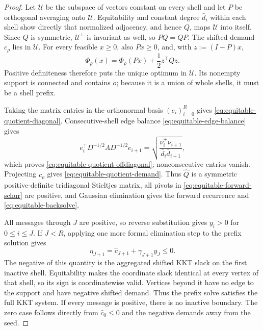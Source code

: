 \begin{proof}
Let $\mathcal U$ be the subspace of vectors constant on every shell and let
$P$ be orthogonal averaging onto $\mathcal U$.  Equitability and constant
degree $\bar d_i$ within each shell show directly that normalized adjacency,
and hence $Q$, maps $\mathcal U$ into itself.  Since $Q$ is symmetric,
$\mathcal U^\perp$ is invariant as well, so $PQ=QP$.  The shifted demand
$c_\rho$ lies in $\mathcal U$.  For every feasible $x\geq0$, also $Px\geq0$,
and, with $z:=(I-P)x$,
\begin{equation}
 \Phi_\rho(x)=\Phi_\rho(Px)+\frac12z^\top Qz.
 \label{eq:equitable-orthogonal-splitting}
\end{equation}
Positive definiteness therefore puts the unique optimum in $\mathcal U$.
Its nonempty support is connected and contains $o$; because it is a union of
whole shells, it must be a shell prefix.

Taking the matrix entries in the orthonormal basis $(e_i)_{i=0}^R$ gives
\cref{eq:equitable-quotient-diagonal}.  Consecutive-shell edge balance
\cref{eq:equitable-edge-balance} gives
\begin{equation*}
 e_i^\top D^{-1/2}AD^{-1/2}e_{i+1}
 =\sqrt{\frac{\nu_i^+\nu_{i+1}^-}
 {\bar d_i\bar d_{i+1}}},
\end{equation*}
which proves
\cref{eq:equitable-quotient-offdiagonal}; nonconsecutive entries vanish.
Projecting $c_\rho$ gives
\cref{eq:equitable-quotient-demand}.  Thus $\widehat Q$ is a symmetric
positive-definite tridiagonal Stieltjes matrix, all pivots in
\cref{eq:equitable-forward-schur} are positive, and Gaussian elimination
gives the forward recurrence and
\cref{eq:equitable-backsolve}.

All messages through $J$ are positive, so reverse substitution gives
$y_i>0$ for $0\leq i\leq J$.  If $J<R$, applying one more formal elimination
step to the prefix solution gives
\begin{equation}
 \eta_{J+1}=\widehat c_{J+1}+\gamma_{J+1}y_J\leq0.
 \label{eq:equitable-message-is-kkt}
\end{equation}
The negative of this quantity is the aggregated shifted KKT slack on the
first inactive shell.  Equitability makes the coordinate slack identical at
every vertex of that shell, so its sign is coordinatewise valid.  Vertices
beyond it have no edge to the support and have negative shifted demand.
Thus the prefix solve satisfies the full KKT system.  If every message is
positive, there is no inactive boundary.  The zero case follows directly
from $\widehat c_0\leq0$ and the negative demands away from the seed.


\end{proof}
